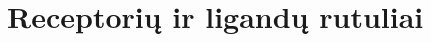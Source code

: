 \documentclass[10pt]{article}
\begin{document}
\section{Receptorių ir ligandų rutuliai}


\end{document}
